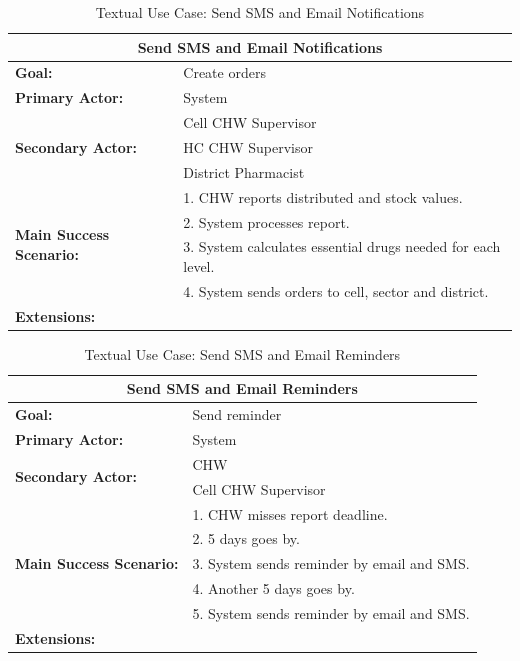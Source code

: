 \begin{table}
	\centering
	\begin{tabular}{|p{5cm}|p{7cm}|}
		\hline
		\multicolumn{2}{|c|}{\textbf{Send SMS and Email Notifications}}\\
		\hline
		\textbf{Goal:} & Create orders\\
		\hline
		\textbf{Primary Actor:} & System\\
		\hline
		\multirow{3}{*}{\textbf{Secondary Actor:}}	& Cell CHW Supervisor \\
																								& HC CHW Supervisor \\ 
																								& District Pharmacist \\
		\hline
		\multirow{4}{*}{\textbf{Main Success Scenario:}}	& 1. CHW reports distributed and stock values. \\
																											& 2. System processes report. \\
																											& 3. System calculates essential drugs needed for each level. \\
																											& 4. System sends orders to cell, sector and district. \\
		\hline
		\textbf{Extensions:} & \\
		\hline
	\end{tabular}
	\caption{Textual Use Case: Send SMS and Email Notifications}
	\label{tab:notifications}
\end{table}


\begin{table}
	\centering
	\begin{tabular}{|p{5cm}|p{7cm}|}
		\hline
		\multicolumn{2}{|c|}{\textbf{Send SMS and Email Reminders}}\\
		\hline
		\textbf{Goal:} & Send reminder \\
		\hline
		\textbf{Primary Actor:} & System \\
		\hline
		\multirow{2}{*}{\textbf{Secondary Actor:}}	& CHW \\
																								& Cell CHW Supervisor \\
		\hline
		\multirow{5}{*}{\textbf{Main Success Scenario:}}	& 1. CHW misses report deadline. \\
																											& 2. 5 days goes by. \\
																											& 3. System sends reminder by email and SMS. \\
																											& 4. Another 5 days goes by. \\
																											& 5. System sends reminder by email and SMS. \\
																											
		\hline
		\textbf{Extensions:} & \\
		\hline
	\end{tabular}
	\caption{Textual Use Case: Send SMS and Email Reminders}
	\label{tab:reminders}
\end{table}



